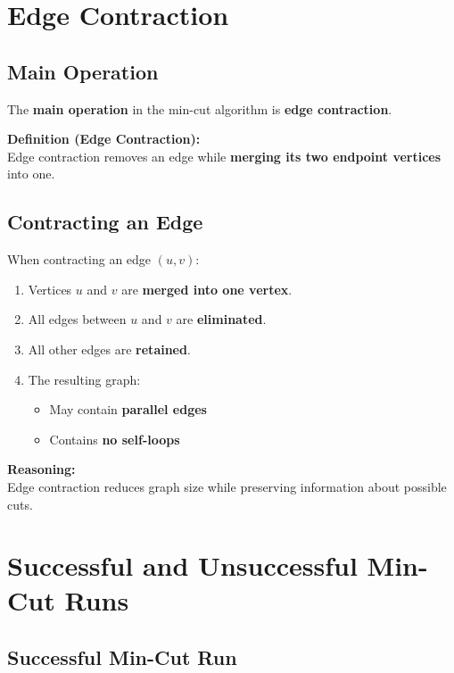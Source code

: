 \documentclass[11pt]{article}
\begin{document}

\section{Edge Contraction}

\subsection{Main Operation}

The \textbf{main operation} in the min-cut algorithm is \textbf{edge contraction}.

\medskip
\textbf{Definition (Edge Contraction):} \\
Edge contraction removes an edge while \textbf{merging its two endpoint vertices} into one.

\subsection{Contracting an Edge}

When contracting an edge $(u, v)$:

\begin{enumerate}
    \item Vertices $u$ and $v$ are \textbf{merged into one vertex}.
    \item All edges between $u$ and $v$ are \textbf{eliminated}.
    \item All other edges are \textbf{retained}.
    \item The resulting graph:
    \begin{itemize}
        \item May contain \textbf{parallel edges}
        \item Contains \textbf{no self-loops}
    \end{itemize}
\end{enumerate}

\noindent
\textbf{Reasoning:} \\
Edge contraction reduces graph size while preserving information about possible cuts.


\section{Successful and Unsuccessful Min-Cut Runs}

\subsection{Successful Min-Cut Run}
\end{document}

